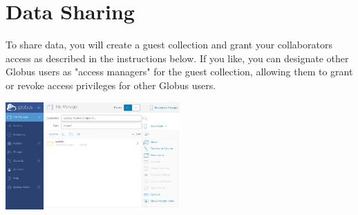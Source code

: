 \chapter{Data Sharing}

To share data, you will create a guest collection and grant your collaborators access as described in the instructions below. If you like, you can designate other Globus users as "access managers" for the guest collection, allowing them to grant or revoke access privileges for other Globus users.

\begin{center}
\includegraphics[width=0.5\textwidth]{img/sharedata-1.png}
\end{center}

